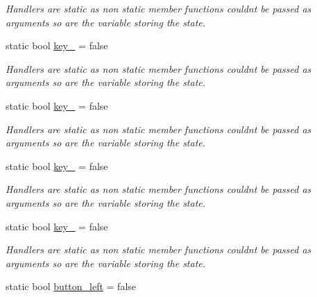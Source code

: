 \begin{DoxyCompactItemize}
\begin{DoxyCompactList}\small\item\em Handlers are static as non static member functions couldn\textquotesingle{}t be passed as arguments so are the variable storing the state. \end{DoxyCompactList}\item 
static bool \hyperlink{classcft_1_1Crafter_aaa2687d319fd3ad3b7e27f80298d9ea8}{key\+\_} = false\hypertarget{classcft_1_1Crafter_aaa2687d319fd3ad3b7e27f80298d9ea8}{}\label{classcft_1_1Crafter_aaa2687d319fd3ad3b7e27f80298d9ea8}

\begin{DoxyCompactList}\small\item\em Handlers are static as non static member functions couldn\textquotesingle{}t be passed as arguments so are the variable storing the state. \end{DoxyCompactList}\item 
static bool \hyperlink{classcft_1_1Crafter_af67075057122adcf1e6d25ebe5cb9142}{key\+\_} = false\hypertarget{classcft_1_1Crafter_af67075057122adcf1e6d25ebe5cb9142}{}\label{classcft_1_1Crafter_af67075057122adcf1e6d25ebe5cb9142}

\begin{DoxyCompactList}\small\item\em Handlers are static as non static member functions couldn\textquotesingle{}t be passed as arguments so are the variable storing the state. \end{DoxyCompactList}\item 
static bool \hyperlink{classcft_1_1Crafter_aec1e3274567e07538fff997f19322c41}{key\+\_} = false\hypertarget{classcft_1_1Crafter_aec1e3274567e07538fff997f19322c41}{}\label{classcft_1_1Crafter_aec1e3274567e07538fff997f19322c41}

\begin{DoxyCompactList}\small\item\em Handlers are static as non static member functions couldn\textquotesingle{}t be passed as arguments so are the variable storing the state. \end{DoxyCompactList}\item 
static bool \hyperlink{classcft_1_1Crafter_a2f81f98cb113930587877ee178a916d4}{key\+\_} = false\hypertarget{classcft_1_1Crafter_a2f81f98cb113930587877ee178a916d4}{}\label{classcft_1_1Crafter_a2f81f98cb113930587877ee178a916d4}

\begin{DoxyCompactList}\small\item\em Handlers are static as non static member functions couldn\textquotesingle{}t be passed as arguments so are the variable storing the state. \end{DoxyCompactList}\item 
static bool \hyperlink{classcft_1_1Crafter_a1e09ec121632860c6f8eaf7439eca600}{button\+\_\+left} = false\hypertarget{classcft_1_1Crafter_a1e09ec121632860c6f8eaf7439eca600}{}\label{classcft_1_1Crafter_a1e09ec121632860c6f8eaf7439eca600}


\end{DoxyCompactItemize}
